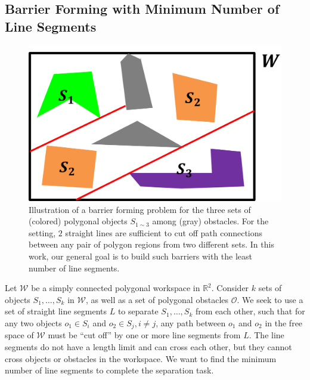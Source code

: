 \subsection{Barrier Forming with Minimum Number of Line Segments}

\begin{figure}[ht]
    \centering
    \vspace{.05in}
    \includegraphics[width = .35\textwidth]{chapters/bf/fig/formulation_pic.png}
    \vspace{.05in}
    \caption[Illustration of a barrier forming problem for the three sets of polygonal objects]
    {Illustration of a barrier forming problem for the three sets of (colored) polygonal objects $S_{1\sim3}$ among (gray) obstacles. 
    For the setting, $2$ straight lines are sufficient to cut off path connections between any pair of polygon regions from two different sets. 
    In this work, our general goal is to build such barriers with the least number of line segments.}
    \label{fig:bf-illustration}
\end{figure}

Let $\mathcal{W}$ be a simply connected polygonal workspace in $\mathbb R^2$. Consider $k$ sets of objects $S_1, \dots, S_k$ in $\mathcal W$, as well as a set of polygonal obstacles $\mathcal O$. 
We seek to use a set of straight line segments $L$ to separate $S_1, \dots, S_k$ from each other, such that for any two objects $o_1 \in S_i$ and $o_2 \in S_j, i \ne j$, any path between $o_1$ and $o_2$ in the free space of $\mathcal W$ must be ``cut off'' by one or more line segments from $L$. 
The line segments do not have a length limit and can cross each other, but they cannot cross objects or obstacles in the workspace. We want to find the minimum number of line segments to complete the separation task. 

